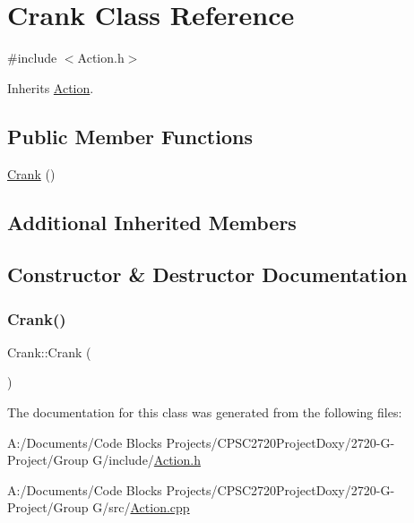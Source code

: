 \hypertarget{class_crank}{}\section{Crank Class Reference}
\label{class_crank}


{\ttfamily \#include $<$Action.\+h$>$}



Inherits \mbox{\hyperlink{class_action}{Action}}.

\subsection*{Public Member Functions}
\begin{DoxyCompactItemize}
\item 
\mbox{\hyperlink{class_crank_aff83301bdbcca4688c5b3c0199673cde}{Crank}} ()
\end{DoxyCompactItemize}
\subsection*{Additional Inherited Members}


\subsection{Constructor \& Destructor Documentation}
\mbox{\label{class_crank_aff83301bdbcca4688c5b3c0199673cde}} 
\subsubsection{\texorpdfstring{Crank()}{Crank()}}
{\footnotesize\ttfamily Crank\+::\+Crank (\begin{DoxyParamCaption}{ }\end{DoxyParamCaption})}



The documentation for this class was generated from the following files\+:\begin{DoxyCompactItemize}
\item 
A\+:/\+Documents/\+Code Blocks Projects/\+C\+P\+S\+C2720\+Project\+Doxy/2720-\/\+G-\/\+Project/\+Group G/include/\mbox{\hyperlink{_action_8h}{Action.\+h}}\item 
A\+:/\+Documents/\+Code Blocks Projects/\+C\+P\+S\+C2720\+Project\+Doxy/2720-\/\+G-\/\+Project/\+Group G/src/\mbox{\hyperlink{_action_8cpp}{Action.\+cpp}}\end{DoxyCompactItemize}
